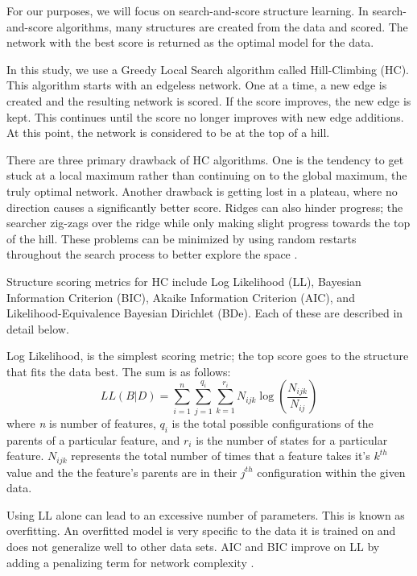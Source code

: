\documentclass[letterpaper]{article}
\begin{document}
For our purposes, we will focus on search-and-score structure learning. In search-and-score algorithms, many structures are created from the data and scored. The network with the best score is returned as the optimal model for the data.

In this study, we use a Greedy Local Search algorithm called Hill-Climbing (HC). This algorithm starts with an edgeless network. One at a time, a new edge is created and the resulting network is scored. If the score improves, the new edge is kept. This continues until the score no longer improves with new edge additions. At this point, the network is considered to be at the top of a hill.

There are three primary drawback of HC algorithms. One is the tendency to get stuck at a local maximum rather than continuing on to the global maximum, the truly optimal network. Another drawback is getting lost in a plateau, where no direction causes a significantly better score. Ridges can also hinder progress; the searcher zig-zags over the ridge while only making slight progress towards the top of the hill. These problems can be minimized by using random restarts throughout the search process to better explore the space \cite{Russell1995}.

Structure scoring metrics for HC include Log Likelihood (LL), Bayesian Information Criterion (BIC), Akaike Information Criterion (AIC), and Likelihood-Equivalence Bayesian Dirichlet (BDe). Each of these are described in detail below.

 Log Likelihood, is the simplest scoring metric; the top score goes to the structure that fits the data best. The sum is as follows:
 \begin{equation}
    LL(B | D) = \sum_{i=1}^{n}\sum_{j=1}^{q_i}\sum_{k=1}^{r_i}N_{ijk}\log(\frac{N_{ijk}}{N_{ij}})
\end{equation}
 where \textit{n} is number of features, $q_i$ is the total possible configurations of the parents of a particular feature, and $r_i$ is the number of states for a particular feature. $N_{ijk}$ represents the total number of times that a feature takes it's $k^{th}$ value and the the feature's parents are in their $j^{th}$ configuration within the given data.
 
 
 Using LL alone can lead to an excessive number of parameters. This is known as overfitting. An overfitted model is very specific to the data it is trained on and does not generalize well to other data sets. AIC and BIC improve on LL by adding a penalizing term for network complexity \cite{Vol2012}.
\end{document}

